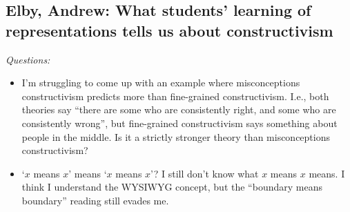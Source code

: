 \documentclass[12pt]{article}
\begin{document}
\subsection*{Elby, Andrew: What students' learning of representations
tells us about constructivism}

\textit{Questions:}
\begin{itemize}
\item I'm struggling to come up with an example where misconceptions
constructivism predicts more than fine-grained constructivism.  I.e.,
both theories say ``there are some who are consistently right, and some
who are consistently wrong'', but fine-grained constructivism says
something about people in the middle.  Is it a strictly stronger theory
than misconceptions constructivism?
\item `$x$ means $x$' means `$x$ means $x$'?  I still don't know what
$x$ means $x$ means.  I think I understand the WYSIWYG concept, but the
``boundary means boundary'' reading still evades me.
\end{itemize}
\end{document}
